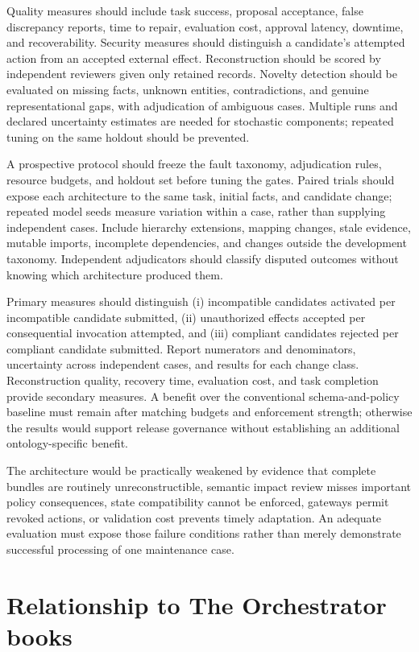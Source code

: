 \documentclass[preprint,12pt,authoryear]{elsarticle}
\begin{document}
Quality measures should include task success, proposal acceptance, false
discrepancy reports, time to repair, evaluation cost, approval latency,
downtime, and recoverability. Security measures should distinguish a
candidate's attempted action from an accepted external effect.
Reconstruction should be scored by independent reviewers given only
retained records. Novelty detection should be evaluated on missing
facts, unknown entities, contradictions, and genuine representational
gaps, with adjudication of ambiguous cases. Multiple runs and declared
uncertainty estimates are needed for stochastic components; repeated
tuning on the same holdout should be prevented.

A prospective protocol should freeze the fault taxonomy, adjudication
rules, resource budgets, and holdout set before tuning the gates. Paired
trials should expose each architecture to the same task, initial facts,
and candidate change; repeated model seeds measure variation within a
case, rather than supplying independent cases. Include hierarchy
extensions, mapping changes, stale evidence, mutable imports, incomplete
dependencies, and changes outside the development taxonomy. Independent
adjudicators should classify disputed outcomes without knowing which
architecture produced them.

Primary measures should distinguish (i) incompatible candidates
activated per incompatible candidate submitted, (ii) unauthorized
effects accepted per consequential invocation attempted, and (iii)
compliant candidates rejected per compliant candidate submitted. Report
numerators and denominators, uncertainty across independent cases, and
results for each change class. Reconstruction quality, recovery time,
evaluation cost, and task completion provide secondary measures. A
benefit over the conventional schema-and-policy baseline must remain
after matching budgets and enforcement strength; otherwise the results
would support release governance without establishing an additional
ontology-specific benefit.

The architecture would be practically weakened by evidence that complete
bundles are routinely unreconstructible, semantic impact review misses
important policy consequences, state compatibility cannot be enforced,
gateways permit revoked actions, or validation cost prevents timely
adaptation. An adequate evaluation must expose those failure conditions
rather than merely demonstrate successful processing of one maintenance
case.

\section{Relationship to The Orchestrator
books}\label{relationship-to-the-orchestrator-books}
\end{document}
